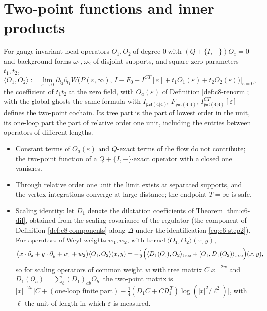 \section{Two-point functions and inner products}

\begin{definition}
\label{def:c8-2pt}
For gauge-invariant local operators $O_1,O_2$ of degree $0$ with $(Q+\{I,-\})O_a=0$ and background forms $\omega_1,\omega_2$ of disjoint supports, and square-zero parameters $t_1,t_2$,
\[
\big\langle O_1,O_2\big\rangle:=\lim_{\varepsilon\to0}\partial_{t_2}\partial_{t_1}W\big(P(\varepsilon,\infty),\,I-F_0-I^{CT}[\varepsilon]+t_1O_1(\varepsilon)+t_2O_2(\varepsilon)\big)\Big|_{e=0},
\]
the coefficient of $t_1t_2$ at the zero field, with $O_a(\varepsilon)$ of Definition \ref{def:c8-renorm}; with the global ghosts the same formula with $I_{\mathfrak{psl}(4|4)}$, $F_{\mathfrak{psl}(4|4)}$, $I^{CT}_{\mathfrak{psl}(4|4)}[\varepsilon]$ defines the two-point cochain. Its tree part is the part of lowest order in the unit, its one-loop part the part of relative order one unit, including the entries between operators of different lengths.
\end{definition}

\begin{proposition}
\label{prop:c8-2pt}
\begin{itemize}
\item[(i)] Constant terms of $O_a(\varepsilon)$ and $Q$-exact terms of the flow do not contribute; the two-point function of a $Q+\{I,-\}$-exact operator with a closed one vanishes.
\item[(ii)] Through relative order one unit the limit exists at separated supports, and the vertex integrations converge at large distance; the endpoint $T=\infty$ is safe.
\item[(iii)] Scaling identity: let $D_1$ denote the dilatation coefficients of Theorem \ref{thm:c6-dil}, obtained from the scaling covariance of the regulator (the component of Definition \ref{def:c8-components} along $\Delta$ under the identification \eqref{eq:c6-step2}). For operators of Weyl weights $w_1,w_2$, with kernel $\langle O_1,O_2\rangle(x,y)$,
\[
\big(x\cdot\partial_x+y\cdot\partial_y+w_1+w_2\big)\langle O_1,O_2\rangle(x,y)=-\tfrac12\Big(\langle D_1(O_1),O_2\rangle_{\rm tree}+\langle O_1,D_1(O_2)\rangle_{\rm tree}\Big)(x,y),
\]
so for scaling operators of common weight $w$ with tree matrix $C|x|^{-2w}$ and $D_1(O_a)=\sum_b(D_1)_{ab}O_b$, the two-point matrix is $|x|^{-2w}\big[C+(\text{one-loop finite part})-\tfrac14(D_1C+CD_1^{\,T})\log(|x|^2/\ell^2)\big]$, with $\ell$ the unit of length in which $\varepsilon$ is measured.
\end{itemize}
\end{proposition}

